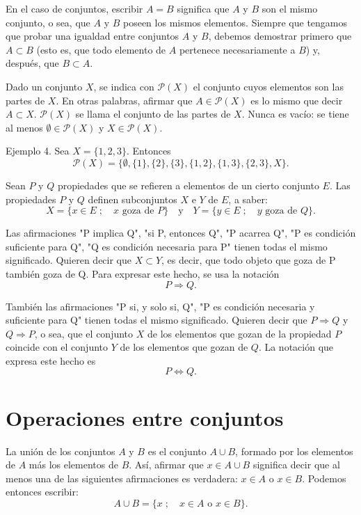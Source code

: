 \documentclass[12pt,oneside]{book}
\begin{document}
En el caso de conjuntos, escribir \(A = B\) significa que \(A\) y \(B\) son el mismo conjunto, o sea, que \(A\) y \(B\) poseen los mismos elementos. Siempre que tengamos que probar una igualdad entre conjuntos \(A\) y \(B\), debemos demostrar primero que \(A \subset B\) (esto es, que todo elemento de \(A\) pertenece necesariamente a \(B\)) y, después, que \(B \subset A\).

Dado un conjunto \(X\), se indica con \(\mathcal{P}(X)\) el conjunto cuyos elementos son las partes de \(X\). En otras palabras, afirmar que \(A \in \mathcal{P}(X)\) es lo mismo que decir \(A \subset X\). \(\mathcal{P}(X)\) se llama el conjunto de las partes de \(X\). Nunca es vacío: se tiene al menos \(\emptyset \in \mathcal{P}(X)\) y \(X \in \mathcal{P}(X)\).

Ejemplo 4. Sea \(X = \{1, 2, 3\}\). Entonces
\[
\mathcal{P}(X) = \{\emptyset, \{1\}, \{2\}, \{3\}, \{1, 2\}, \{1, 3\}, \{2, 3\}, X\}.
\]

Sean \(P\) y \(Q\) propiedades que se refieren a elementos de un cierto conjunto \(E\). Las propiedades \(P\) y \(Q\) definen subconjuntos \(X\) e \(Y\) de \(E\), a saber:
\[
X = \{x \in E \; ; \quad x \text{ goza de } P\} \quad \text{y} \quad Y = \{y \in E \; ; \quad y \text{ goza de } Q\}.
\]

Las afirmaciones "P implica Q", "si P, entonces Q", "P acarrea Q", "P es condición suficiente para Q", "Q es condición necesaria para P" tienen todas el mismo significado. Quieren decir que \(X \subset Y\), es decir, que todo objeto que goza de P también goza de Q. Para expresar este hecho, se usa la notación
\[
P \Rightarrow Q.
\]

También las afirmaciones "P si, y solo si, Q", "P es condición necesaria y suficiente para Q" tienen todas el mismo significado. Quieren decir que \(P \Rightarrow Q\) y \(Q \Rightarrow P\), o sea, que el conjunto \(X\) de los elementos que gozan de la propiedad \(P\) coincide con el conjunto \(Y\) de los elementos que gozan de \(Q\). La notación que expresa este hecho es
\[
P \Leftrightarrow Q.
\]

\section{Operaciones entre conjuntos}

La unión de los conjuntos \(A\) y \(B\) es el conjunto \(A \cup B\), formado por los elementos de \(A\) más los elementos de \(B\). Así, afirmar que \(x \in A \cup B\) significa decir que al menos una de las siguientes afirmaciones es verdadera: \(x \in A\) o \(x \in B\). Podemos entonces escribir:
\[
A \cup B = \{x \; ; \quad x \in A \text{ o } x \in B\}.
\]
\end{document}

